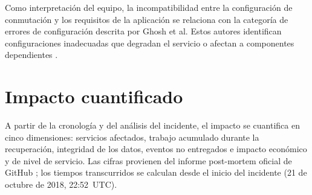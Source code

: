 \documentclass[11pt,a4paper]{article}
\begin{document}
Como interpretación del equipo, la incompatibilidad
entre la configuración de conmutación y los requisitos
de la aplicación se relaciona con la categoría de
errores de configuración descrita por Ghosh et al.
Estos autores identifican configuraciones inadecuadas
que degradan el servicio o afectan a componentes
dependientes \cite{ghosh2022}.

\section{Impacto cuantificado}
A partir de la cronolog\'ia y del an\'alisis del incidente, el impacto se cuantifica en cinco dimensiones: servicios afectados, trabajo acumulado durante la recuperaci\'on, integridad de los datos, eventos no entregados e impacto econ\'omico y de nivel de servicio. Las cifras provienen del informe post-mortem oficial de GitHub \cite{github2018}; los tiempos transcurridos se calculan desde el inicio del incidente (21 de octubre de 2018, 22:52~UTC).
\end{document}
